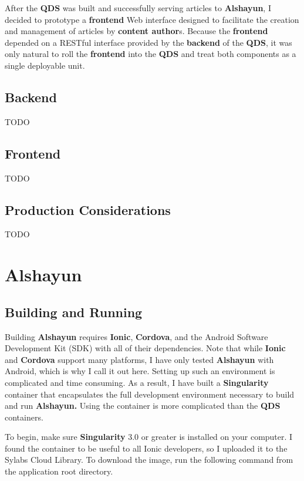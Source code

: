 \documentclass[12pt]{report}
\begin{document}
After the \textbf{QDS} was built and successfully serving articles to
\textbf{Alshayun}, I decided to prototype a \textbf{frontend} Web interface
designed to facilitate the creation and management of articles by
\textbf{content author}s. Because the \textbf{frontend} depended on a RESTful
interface provided by the \textbf{backend} of the \textbf{QDS}, it was only
natural to roll the \textbf{frontend} into the \textbf{QDS} and treat both
components as a single deployable unit.

    \section{Backend}

TODO

    \section{Frontend}

TODO

    \section{Production Considerations}
    
TODO

\chapter{Alshayun}

    \section{Building and Running}

Building \textbf{Alshayun} requires \textbf{Ionic}, \textbf{Cordova}, and the
Android Software Development Kit (SDK) with all of their dependencies. Note that
while \textbf{Ionic} and \textbf{Cordova} support many platforms, I have only
tested \textbf{Alshayun} with Android, which is why I call it out here. Setting
up such an environment is complicated and time consuming. As a result, I have
built a \textbf{Singularity} container that encapsulates the full development
environment necessary to build and run \textbf{Alshayun.} Using the container is
more complicated than the \textbf{QDS} containers.

To begin, make sure \textbf{Singularity} 3.0 \cite{singularity3inst} or greater
is installed on your computer. I found the container to be useful to all Ionic
developers, so I uploaded it to the Sylabs Cloud Library. To download the image,
run the following command from the application root directory.
\end{document}
